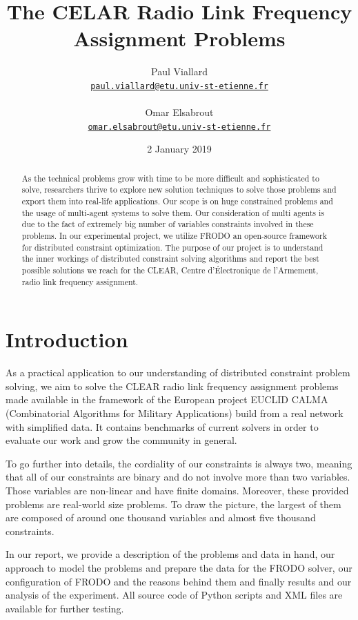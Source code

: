 \documentclass{article}
\title{The CELAR Radio Link Frequency Assignment Problems}
\author{Paul Viallard\\
	\texttt{\href{mailto:paul.viallard@etu.univ-st-etienne.fr}{paul.viallard@etu.univ-st-etienne.fr}} 
	\\\\ Omar Elsabrout\\
	\texttt{\href{mailto:omar.elsabrout@etu.univ-st-etienne.fr}{omar.elsabrout@etu.univ-st-etienne.fr}}}
\date{2 January 2019}
\begin{document}
	\maketitle
	
	\begin{abstract}
		As the technical problems grow with time to be more difficult and sophisticated to solve, researchers thrive to explore new solution techniques to solve those problems and export them into real-life applications. Our scope is on huge constrained problems and the usage of multi-agent systems to solve them. Our consideration of multi agents is due to the fact of extremely big number of variables constraints involved in these problems. In our experimental project, we utilize FRODO\cite{FRODO} an open-source framework for distributed constraint optimization. The purpose of our project is to understand the inner workings of distributed constraint solving algorithms and report the best possible solutions we reach for the CLEAR, Centre d’Électronique de l’Armement, radio link frequency assignment.
	\end{abstract}
	
	\section{Introduction}
	As a practical application to our understanding of distributed constraint problem solving, we aim to solve the CLEAR radio link frequency assignment problems made available in the framework of the European project EUCLID CALMA (Combinatorial Algorithms for Military Applications) build from a real network with simplified data. It contains benchmarks of current solvers in order to evaluate our work and grow the community in general.
	
	To go further into details, the cordiality of our constraints is always two, meaning that all of our constraints are binary and do not involve more than two variables. Those variables are non-linear and have finite domains. Moreover, these provided problems are real-world size problems. To draw the picture, the largest of them are composed of around one thousand variables and almost five thousand constraints.
	
	In our report, we provide a description of the problems and data in hand, our approach to model the problems and prepare the data for the FRODO solver, our configuration of FRODO and the reasons behind them and finally results and our analysis of the experiment. All source code of Python scripts and XML files are available for further testing.
	
\end{document}

